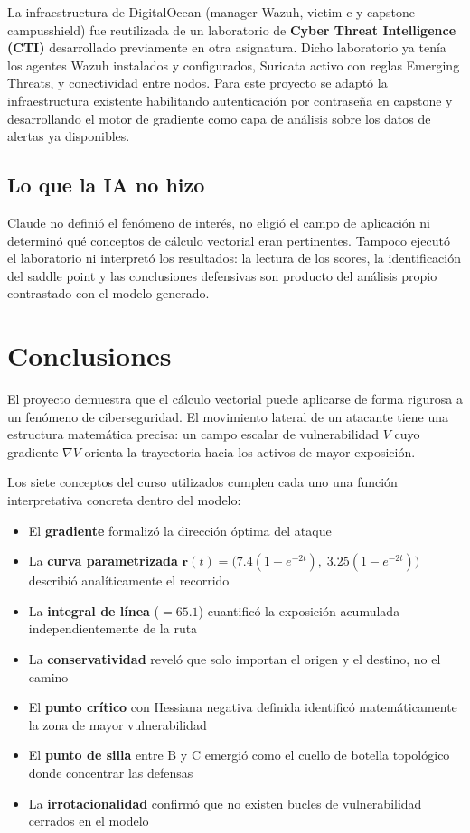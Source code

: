 \documentclass[12pt,a4paper]{article}
\newcommand{\grad}{\nabla}
\begin{document}
La infraestructura de DigitalOcean (manager Wazuh, victim-c y
capstone-campusshield) fue reutilizada de un laboratorio de
\textbf{Cyber Threat Intelligence (CTI)} desarrollado previamente en
otra asignatura. Dicho laboratorio ya tenía los agentes Wazuh
instalados y configurados, Suricata activo con reglas Emerging Threats,
y conectividad entre nodos. Para este proyecto se adaptó la
infraestructura existente habilitando autenticación por contraseña en
capstone y desarrollando el motor de gradiente como capa de análisis
sobre los datos de alertas ya disponibles.

\subsection*{Lo que la IA no hizo}

Claude no definió el fenómeno de interés, no eligió el campo de
aplicación ni determinó qué conceptos de cálculo vectorial eran
pertinentes. Tampoco ejecutó el laboratorio ni interpretó los
resultados: la lectura de los scores, la identificación del saddle
point y las conclusiones defensivas son producto del análisis propio
contrastado con el modelo generado.

\section{Conclusiones}

El proyecto demuestra que el cálculo vectorial puede aplicarse de forma
rigurosa a un fenómeno de ciberseguridad. El movimiento lateral de un
atacante tiene una estructura matemática precisa: un campo escalar de
vulnerabilidad $V$ cuyo gradiente $\grad V$ orienta la trayectoria
hacia los activos de mayor exposición.

Los siete conceptos del curso utilizados cumplen cada uno una función
interpretativa concreta dentro del modelo:

\begin{itemize}
  \item El \textbf{gradiente} formalizó la dirección óptima del ataque
  \item La \textbf{curva parametrizada} $\mathbf{r}(t) = \bigl(7.4(1-e^{-2t}),\;
    3.25(1-e^{-2t})\bigr)$ describió analíticamente el recorrido
  \item La \textbf{integral de línea} ($= 65.1$) cuantificó la exposición
    acumulada independientemente de la ruta
  \item La \textbf{conservatividad} reveló que solo importan el origen
    y el destino, no el camino
  \item El \textbf{punto crítico} con Hessiana negativa definida
    identificó matemáticamente la zona de mayor vulnerabilidad
  \item El \textbf{punto de silla} entre B y C emergió como el cuello
    de botella topológico donde concentrar las defensas
  \item La \textbf{irrotacionalidad} confirmó que no existen bucles
    de vulnerabilidad cerrados en el modelo
\end{itemize}
\end{document}
